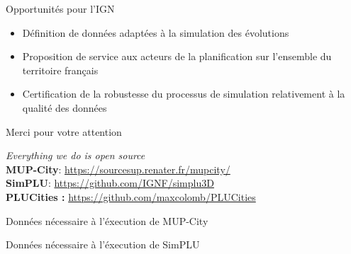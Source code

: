 \documentclass[xcolor=table]{beamer}
\newcommand\FontPetit{\fontsize{8}{6}\selectfont}
\begin{document}
\begin{frame}{Opportunités pour l'IGN}
	\begin{itemize}
	\item Définition de données adaptées à la simulation des évolutions
	\item Proposition de service aux acteurs de la planification sur l'ensemble du territoire français
	\item Certification de la robustesse du processus de simulation relativement à la qualité des données
	\end{itemize}
\end{frame}

\begin{frame}[standout]
	\centering
	\begin{block}{}	
		\centering	
		Merci pour votre attention
	\end{block}
	\begin{block}{}
		\centering
		\textit{Everything we do is open source}\\
		\large
		\textbf{MUP-City}: \url{https://sourcesup.renater.fr/mupcity/} \\
		\textbf{SimPLU}: \url{https://github.com/IGNF/simplu3D}\\
		\textbf{PLUCities :} \url{https://github.com/maxcolomb/PLUCities}  
	\end{block}
\end{frame}

\begin{frame}{Données nécessaire à l'éxecution de MUP-City}
\end{frame}
\begin{frame}{Données nécessaire à l'éxecution de SimPLU}
\end{frame}
\end{document}
